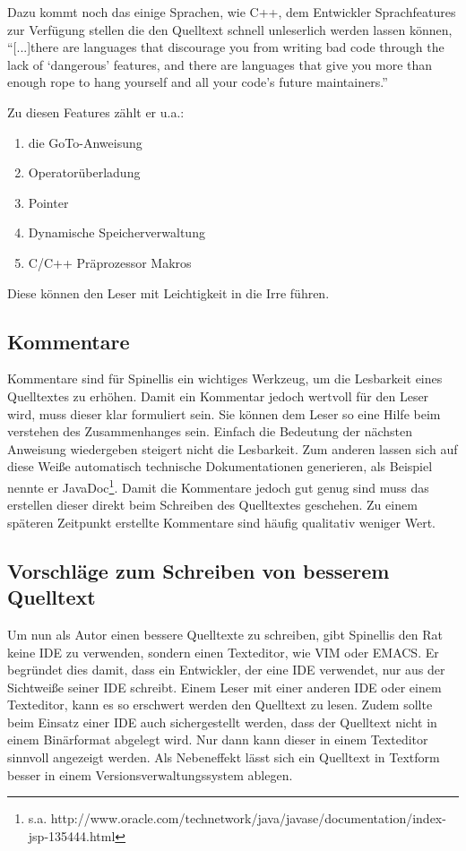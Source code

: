 Dazu kommt noch das einige Sprachen, wie C++, dem Entwickler Sprachfeatures zur Verfügung stellen die den Quelltext schnell unleserlich werden lassen können, \enquote{[...]there are languages that discourage you from writing bad code through the lack of \enquote{dangerous} features, and there are languages that give you more than enough rope to hang yourself and all your code’s future maintainers.}\cite[S. 87]{Spinellis}

Zu diesen Features zählt er u.a.:
\begin{enumerate}
\item die GoTo-Anweisung
\item Operatorüberladung
\item Pointer
\item Dynamische Speicherverwaltung 
\item C/C++ Präprozessor Makros
\end{enumerate}

Diese können den Leser mit Leichtigkeit in die Irre führen.

\subsection{Kommentare}
Kommentare sind für Spinellis ein wichtiges Werkzeug, um die Lesbarkeit eines Quelltextes zu erhöhen. Damit ein Kommentar jedoch wertvoll für den Leser wird, muss dieser klar formuliert sein. Sie können dem Leser so eine Hilfe beim verstehen des Zusammenhanges sein. Einfach die Bedeutung der nächsten Anweisung wiedergeben steigert nicht die Lesbarkeit. Zum anderen lassen sich auf diese Weiße automatisch technische Dokumentationen generieren, als Beispiel nennte er JavaDoc\footnote{s.a. http://www.oracle.com/technetwork/java/javase/documentation/index-jsp-135444.html}. Damit die Kommentare jedoch gut genug sind muss das erstellen dieser direkt beim Schreiben des Quelltextes geschehen. Zu einem späteren Zeitpunkt erstellte Kommentare sind häufig qualitativ weniger Wert. \cite[S. 88]{Spinellis}

\subsection{Vorschläge zum Schreiben von besserem Quelltext}
Um nun als Autor einen bessere Quelltexte zu schreiben, gibt Spinellis den Rat keine IDE zu verwenden, sondern einen Texteditor, wie VIM oder EMACS. Er begründet dies damit, dass ein Entwickler, der eine IDE verwendet, nur aus der Sichtweiße seiner IDE schreibt. Einem Leser mit einer anderen IDE oder einem Texteditor, kann es so erschwert werden den Quelltext zu lesen. Zudem sollte beim Einsatz einer IDE auch sichergestellt werden, dass der Quelltext nicht in einem Binärformat abgelegt wird. Nur dann kann dieser in einem Texteditor sinnvoll angezeigt werden. Als Nebeneffekt lässt sich ein Quelltext in Textform besser in einem Versionsverwaltungssystem ablegen. \cite[S. 88]{Spinellis}

